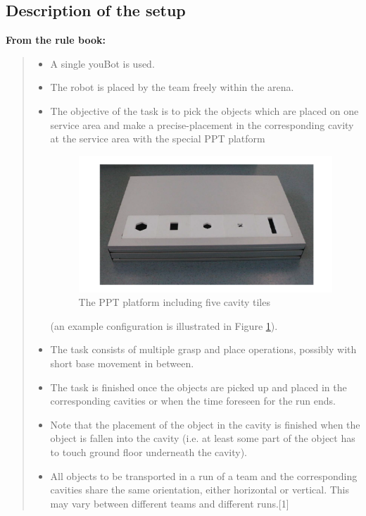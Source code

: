 \documentclass{article}
\begin{document}
\subsection{Description of the setup}
\textbf{From the rule book:}
\begin{quote}
\begin{itemize}
\item A single youBot is used. 
\item The robot is placed by the team freely within the arena. 
\item The objective of the task is to pick the objects which are placed on one service area and make a
precise-placement in the corresponding cavity at the service area with the special PPT platform
\begin{figure}[h!]
\centering
\includegraphics[scale=0.5]{images/PPT_Platform.png}
\caption{The PPT platform including five cavity tiles}
\label{fig:PPT}
\end{figure}
(an example configuration is illustrated in Figure
\ref{fig:PPT}).
\item The task consists of multiple grasp and place operations, possibly with short base movement in between. 
\item The task is finished once the objects are picked up and
placed in the corresponding cavities or when the time foreseen for the run ends.
\item  Note that the
placement of the object in the cavity is finished when the object is fallen into the cavity (i.e.  at
least some part of the object has to touch ground floor underneath the cavity).
\item All objects to be transported in a run of a team and the corresponding cavities share the same
orientation, either horizontal or vertical.  This may vary between different teams and different
runs.[1]
\end{itemize}

\end{quote}
\end{document}
